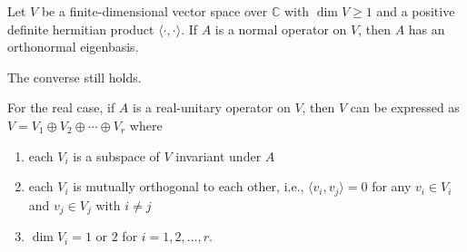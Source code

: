 \documentclass{ctexart}
\newcommand{\C}{\mathbb{C}}
\begin{document}
    \begin{mythm}
        Let $V$ be a finite-dimensional vector space over $\C$ with $\dim V\ge 1$ and a positive definite hermitian product $\langle \cdot, \cdot \rangle$. If $A$ is a normal operator on $V$, then $A$ has an orthonormal eigenbasis.
    \end{mythm}
    \begin{myrmk}
        The converse still holds.
    \end{myrmk}
    \begin{mythm}
        For the real case, if $A$ is a real-unitary operator on $V$, then $V$ can be expressed as $V=V_1 \oplus V_2 \oplus \cdots \oplus V_r$ where
        \begin{enumerate}
            \item each $V_i$ is a subspace of $V$ invariant under $A$
            \item each $V_i$ is mutually orthogonal to each other, i.e., $\langle v_i, v_j \rangle = 0$ for any $v_i \in V_i$ and $v_j \in V_j$ with $i\neq j$
            \item $\dim V_i = 1$ or $2$ for $i=1,2,\ldots,r$.
        \end{enumerate}
    \end{mythm}
\end{document}
